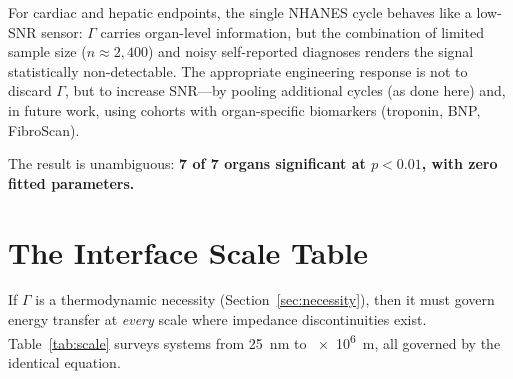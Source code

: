 \documentclass[aps,pre,twocolumn,superscriptaddress,floatfix]{revtex4-2}
\begin{document}
For cardiac and hepatic endpoints, the single NHANES cycle
behaves like a low-SNR sensor: $\Gamma$ carries
organ-level information, but the combination of limited
sample size ($n \approx 2{,}400$) and noisy self-reported
diagnoses renders the signal statistically non-detectable.
The appropriate engineering response is not to discard
$\Gamma$, but to increase SNR---by pooling additional cycles
(as done here) and, in future work, using cohorts with
organ-specific biomarkers (troponin, BNP, FibroScan).

The result is unambiguous: \textbf{7 of 7 organs significant
at $p < 0.01$, with zero fitted parameters.}


\section{The Interface Scale Table}
\label{sec:scale-table}

If $\Gamma$ is a thermodynamic necessity (Section~\ref{sec:necessity}),
then it must govern energy transfer at \emph{every} scale
where impedance discontinuities exist.
Table~\ref{tab:scale} surveys systems from
\SI{25}{nm} to \SI{e6}{m}, all governed by the identical
equation.
\end{document}
